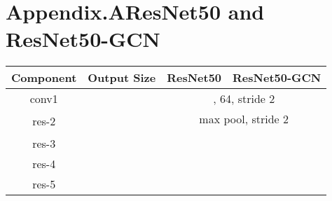 \documentclass[10pt,twocolumn,letterpaper]{article}
\begin{document}
   \section*{\centering Appendix.A\quad ResNet50 and ResNet50-GCN}
   \begin{table*}[h]
      \small
      \begin{center}
         \begin{tabular}{|c|c|c|c|}
            \hline
            Component & Output Size & ResNet50 & ResNet50-GCN \\
            \hline
            conv1 &  & \multicolumn{2}{c|}{, 64, stride 2 } \\
            \hline
            \multirow{5}{*}{res-2} & \multirow{5}{*}{} & \multicolumn{2}{c|}{ max pool, stride 2} \\
            \cline{3-4} & & \multirow{4}{*}{} &  
                            \multirow{4}{*}{} \\ 
            & & \multicolumn{1}{c|}{} & \multicolumn{1}{c|}{}\\
            & & \multicolumn{1}{c|}{} & \multicolumn{1}{c|}{}\\
            & & \multicolumn{1}{c|}{} & \multicolumn{1}{c|}{}\\
            \hline
            \multirow{4}{*}{res-3} & \multirow{4}{*}{} & 
            				\multirow{4}{*}{} &  
                            \multirow{4}{*}{} \\ 
            & & \multicolumn{1}{c|}{} & \multicolumn{1}{c|}{}\\
            & & \multicolumn{1}{c|}{} & \multicolumn{1}{c|}{}\\
            & & \multicolumn{1}{c|}{} & \multicolumn{1}{c|}{}\\
            \hline
            \multirow{4}{*}{res-4} & \multirow{4}{*}{}& 
            				\multirow{4}{*}{} &  
                            \multirow{4}{*}{} \\ 
            & & \multicolumn{1}{c|}{} & \multicolumn{1}{c|}{}\\
            & & \multicolumn{1}{c|}{} & \multicolumn{1}{c|}{}\\
            & & \multicolumn{1}{c|}{} & \multicolumn{1}{c|}{}\\
            \hline
            \multirow{4}{*}{res-5} & \multirow{4}{*}{} & 
            				\multirow{4}{*}{} &  
                            \multirow{4}{*}{} \\ 
            & & \multicolumn{1}{c|}{} & \multicolumn{1}{c|}{}\\

\end{tabular}
\end{center}
\end{table*}
\end{document}
